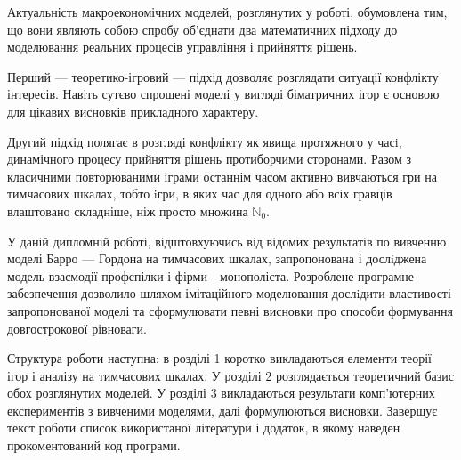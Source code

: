 
Актуальність макроекономічних моделей, розглянутих у роботі, обумовлена
тим, що вони являють собою спробу об'єднати два математичних підходу до
моделювання реальних процесів управління і прийняття рішень. 

Перший --- теоретико-ігровий --- підхід дозволяє розглядати ситуації
конфлікту інтересів. Навіть сутєво спрощені моделі у вигляді біматричних ігор
є основою для цікавих висновків прикладного характеру.

Другий підхід полягає в розгляді конфлікту як явища протяжного у
часi, динамічного процесу прийняття рішень протиборчими сторонами.
Разом з класичними повторюваними іграми останнім часом активно
вивчаються гри на тимчасових шкалах, тобто iгри, в яких час для одного або
всіх гравців влаштовано складніше, ніж просто множина $\mathbb{N}_0$.

У даній дипломній роботі, відштовхуючись від відомих результатів по вивченню
моделі Барро --- Гордона на тимчасових шкалах, запропонована і дослiджена модель
взаємодії профспілки і фірми - монополіста.  Розроблене програмне
забезпечення дозволило шляхом імітаційного моделювання дослiдити властивості
запропонованої моделі та сформулювати певні висновки про способи
формування довгострокової рівноваги.

Структура роботи наступна: в розділі 1 коротко викладаються елементи теорії ігор і
аналізу на тимчасових шкалах. У розділі 2 розглядається теоретичний базис
обох розглянутих моделей. У розділі 3 викладаються результати комп'ютерних
експериментів з вивченими моделями, далі формулюються висновки. Завершує
текст роботи список використаної літератури і додаток, в якому наведен
прокоментований код програми.
